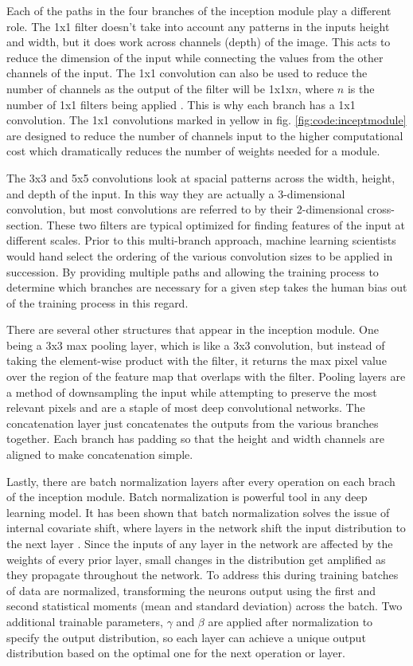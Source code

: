 Each of the paths in the four branches of the inception module play a different role. The 1x1 filter doesn't take into account any patterns in the inputs height and width, but it does work across channels (depth) of the image. This acts to reduce the dimension of the input while connecting the values from the other channels of the input. The 1x1 convolution can also be used to reduce the number of channels as the output of the filter will be 1x1x$n$, where $n$ is the number of 1x1 filters being applied \cite{https://doi.org/10.48550/arxiv.1312.4400}. This is why each branch has a 1x1 convolution. The 1x1 convolutions marked in yellow in fig. \ref{fig:code:inceptmodule} are designed to reduce the number of channels input to the higher computational cost which dramatically reduces the number of weights needed for a module.

The 3x3 and 5x5 convolutions look at spacial patterns across the width, height, and depth of the input. In this way they are actually a 3-dimensional convolution, but most convolutions are referred to by their 2-dimensional cross-section. These two filters are typical optimized for finding features of the input at different scales. Prior to this multi-branch approach, machine learning scientists would hand select the ordering of the various convolution sizes to be applied in succession. By providing multiple paths and allowing the training process to determine which branches are necessary for a given step takes the human bias out of the training process in this regard.

There are several other structures that appear in the inception module. One being a 3x3 max pooling layer, which is like a 3x3 convolution, but instead of taking the element-wise product with the filter, it returns the max pixel value over the region of the feature map that overlaps with the filter. Pooling layers are a method of downsampling the input while attempting to preserve the most relevant pixels and are a staple of most deep convolutional networks. The concatenation layer just concatenates the outputs from the various branches together. Each branch has padding so that the height and width channels are aligned to make concatenation simple.

Lastly, there are batch normalization layers after every operation on each brach of the inception module. Batch normalization is powerful tool in any deep learning model. It has been shown that batch normalization solves the issue of internal covariate shift, where layers in the network shift the input distribution to the next layer \cite{https://doi.org/10.48550/arxiv.1502.03167}. Since the inputs of any layer in the network are affected by the weights of every prior layer, small changes in the distribution get amplified as they propagate throughout the network. To address this during training batches of data are normalized, transforming the neurons output using the first and second statistical moments (mean and standard deviation) across the batch. Two additional trainable parameters, $\gamma$ and $\beta$ are applied after normalization to specify the output distribution, so each layer can achieve a unique output distribution based on the optimal one for the next operation or layer.

